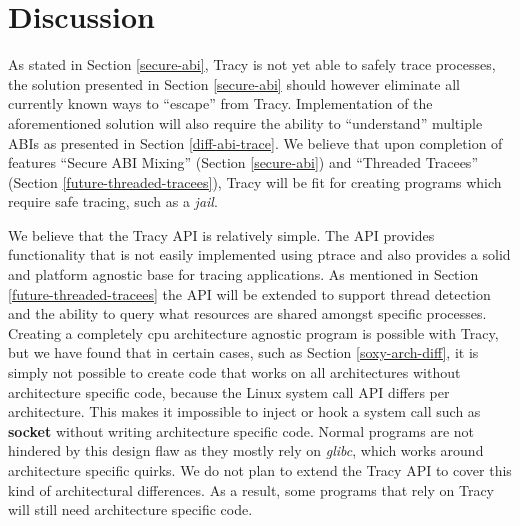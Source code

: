 \documentclass[a4paper, 10pt]{report}
\begin{document}
% 


\chapter{Discussion}

As stated in Section \ref{secure-abi}, Tracy is not yet able to safely trace
processes, the solution presented in Section \ref{secure-abi} should however
eliminate all currently known ways to ``escape'' from Tracy. Implementation of
the aforementioned solution will also require the ability to ``understand''
multiple ABIs as presented in Section \ref{diff-abi-trace}. %
We believe that upon completion of features ``Secure ABI Mixing'' (Section
\ref{secure-abi}) and ``Threaded Tracees'' (Section
\ref{future-threaded-tracees}),
Tracy will be fit for creating programs which require safe tracing,
such as a \textit{jail}.

We believe that the Tracy API is relatively simple.
The API provides
functionality that is not easily implemented using ptrace and also provides a
solid and platform agnostic base for tracing applications. As mentioned in
Section \ref{future-threaded-tracees} the API will be extended to support
thread detection and the ability to query what resources are shared amongst
specific processes. \\

Creating a completely cpu architecture agnostic program is possible with Tracy,
but we have found that in certain cases, such as Section \ref{soxy-arch-diff},
it is simply not possible to create code that works on all architectures without
architecture specific code, because the Linux system call API differs per
architecture. This makes it impossible to inject or hook a system call such as
\textbf{socket} without writing architecture specific code.
Normal programs are not hindered by this design flaw as they mostly rely on
\textit{glibc}, which works around architecture specific quirks. We do not plan
to extend the Tracy API to cover this kind of architectural differences. As a
result, some programs that rely on Tracy will still need architecture specific
code. %
\end{document}
